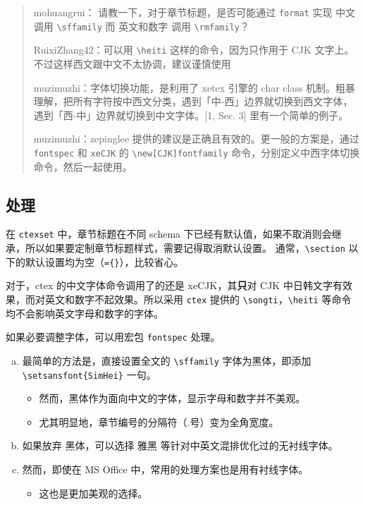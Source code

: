 \documentclass[../Main/thesis.tex]{subfiles}
\begin{document}
\begin{quote}
mohuangrui： 请教一下，对于章节标题，是否可能通过 \texttt{format} 实现 中文 调用 \texttt{\textbackslash{}sffamily} 而 英文和数字 调用 \texttt{\textbackslash{}rmfamily}？

RuixiZhang42：可以用 \texttt{\textbackslash{}heiti} 这样的命令，因为只作用于 CJK 文字上。不过这样西文跟中文不太协调，建议谨慎使用

muzimuzhi：字体切换功能，是利用了 xetex 引擎的 char class 机制。粗暴理解，把所有字符按中西文分类，遇到「中-西」边界就切换到西文字体，遇到「西-中」边界就切换到中文字体。[1, Sec. 3] 里有一个简单的例子。

muzimuzhi：zepinglee 提供的建议是正确且有效的。更一般的方案是，通过 \texttt{fontspec} 和 \texttt{xeCJK} 的
\texttt{\textbackslash{}new[CJK]fontfamily} 命令，分别定义中西字体切换命令，然后一起使用。
\end{quote}

\subsection{处理}

在 \texttt{ctexset} 中，章节标题在不同 schema 下已经有默认值，如果不取消则会继承，所以如果要定制章节标题样式，需要记得取消默认设置。
通常，\texttt{\textbackslash{}section} 以下的默认设置均为空（\texttt{=\{\}}），比较省心。

对于，ctex 的中文字体命令调用了的还是 xeCJK，其\textbf{只}对 CJK 中日韩文字有效果，而对英文和数字不起效果。所以采用 \texttt{ctex} 提供的 \texttt{\textbackslash{}songti}，\texttt{\textbackslash{}heiti} 等命令均不会影响英文字母和数字的字体。

如果必要调整字体，可以用宏包 \texttt{fontspec} 处理。

\begin{enumerate}[a.]
\item
  最简单的方法是，直接设置全文的 \texttt{\textbackslash{}sffamily}
  字体为黑体，即添加 \texttt{\textbackslash{}setsansfont\{SimHei\}}
  一句。

  \begin{itemize}
  \item
    然而，黑体作为面向中文的字体，显示字母和数字并不美观。
  \item
    尤其明显地，章节编号的分隔符（.号）变为全角宽度。
  \end{itemize}
\item
  如果放弃 黑体，可以选择 雅黑 等针对中英文混排优化过的无衬线字体。
\item
  然而，即使在 MS Office 中，常用的处理方案也是用有衬线字体。

  \begin{itemize}
  \item
    这也是更加美观的选择。
  \end{itemize}
\end{enumerate}
\end{document}
